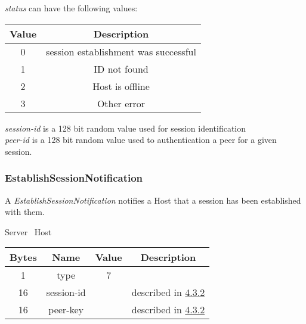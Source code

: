 \documentclass{article}
\begin{document}
    \emph{status} can have the following values:

    \begin{center}
        \begin{tabular}{|c|c|}
            \hline
            \textbf{Value} & \textbf{Description}                 \\
            \hline
            0              & session establishment was successful \\
            \hline
            1              & ID not found                         \\
            \hline
            2              & Host is offline                      \\
            \hline
            3              & Other error                          \\
            \hline
        \end{tabular}
    \end{center}

    \emph{session-id} is a 128 bit random value used for session identification\\

    \emph{peer-id} is a 128 bit random value used to authentication a peer for a given session.\\

    \subsubsection{EstablishSessionNotification}

    A \emph{EstablishSessionNotification} notifies a Host that a session has been established with them.

    \begin{center}
        Server \textrightarrow\ Host\\
        \begin{tabular}{|c|c|c|c|}
            \hline
            \textbf{Bytes} & \textbf{Name} & \textbf{Value} & \textbf{Description}                                \\
            \hline
            1              & type          & 7              &                                                     \\
            \hline
            16             & session-id    &                & described in \hyperlink{subsubsection.4.3.2}{4.3.2} \\
            \hline
            16             & peer-key      &                & described in \hyperlink{subsubsection.4.3.2}{4.3.2} \\
            \hline
        \end{tabular}
    \end{center}
\end{document}
